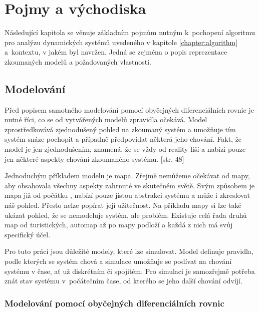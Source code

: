 \chapter{Pojmy a východiska}

Následující kapitola se věnuje základním pojmům nutným k~pochopení
algoritmu pro analýzu dynamických systémů uvedeného v kapitole \ref{chapter:algorithm}
a~kontextu, v jakém byl navržen. Jedná se zejména o popis reprezentace zkou\-ma\-ných
modelů a požadovaných vlastností.


\section{Modelování}

Před popisem samotného modelování pomocí obyčejných diferenciálních rovnic je
nutné říci, co se od vytvářených modelů zpravidla očekává. Model zpro\-středko\-vá\-vá
zjednodušený pohled na zkoumaný systém a umožňuje tím systém snáze pochopit a
případně předpovídat některá jeho chování. Fakt, že model je jen zjednodušením, znamená,
že se vždy od reality liší a nabízí pouze jen některé aspekty chování zkoumaného
systému. [str. 48]


Jednoduchým příkladem modelu je mapa. Zřejmě nemůžeme očekávat od mapy, aby obsahovala
všechny aspekty zahrnuté ve skutečném světě. Svým způsobem je mapa již od počátku
, nabízí pouze jistou abstrakci systému a může i zkreslovat náš pohled.
Přesto nelze popírat její užitečnost. Na příkladu mapy si lze také ukázat pohled, že se
nemodeluje systém, ale problém. Existuje celá řada druhů map od turistických, automap
až po mapy podloží a každá z nich má svůj specifický účel. \cite[str. 47 -- 58]{pelanek2012}

Pro tuto práci jsou důležité modely, které lze simulovat. Model definuje pravidla, podle
kterých se systém chová a simulace umožňuje se podívat na chování systému v čase, ať už
diskrétním či spojitém. Pro simulaci je sa\-mozřej\-mě potřeba znát stav systému v~počátečním
čase, od kterého se jeho další chování odvíjí.

\subsection{Modelování pomocí obyčejných diferenciálních rovnic}

